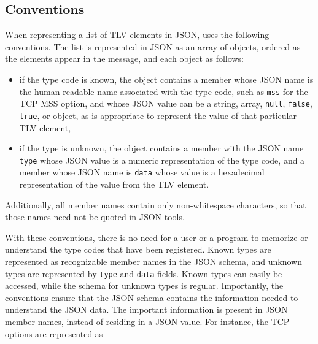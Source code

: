 \documentclass{book}
\begin{document}
\subsection{Conventions}
When representing a list of TLV elements in JSON,  uses the
following conventions.  The list is represented in JSON as an array of
objects, ordered as the elements appear in the message, and each
object as follows:
\begin{itemize}
\item if the type code is known, the object contains a member whose JSON name is the
  human-readable name associated with the type code, such as \texttt{mss} for
  the TCP MSS option, and whose JSON value can be a string, array, \texttt{null}, \texttt{false}, \texttt{true}, or
  object, as is appropriate to represent the value of that particular
  TLV element,
\item if the type is unknown, the object contains a
  member with the JSON name \texttt{type} whose JSON value
  is a numeric representation of the type code, and a member
  whose JSON name is \texttt{data} whose value is a
  hexadecimal representation of the value from the TLV element.
\end{itemize}
Additionally, all member names contain only non-whitespace characters,
so that those names need not be quoted in JSON tools.

With these conventions, there is no need for a user or a program to
memorize or understand the type codes that have been registered.
Known types are represented as recognizable member names in the JSON
schema, and unknown types are represented by \texttt{type} and
\texttt{data} fields.  Known types can easily be accessed, while the
schema for unknown types is regular.  
Importantly, the conventions ensure that the JSON schema contains the
information needed to understand the JSON data.  The important
information is present in JSON member names, instead of residing in a
JSON value.
For instance, the TCP options are represented as
\end{document}
